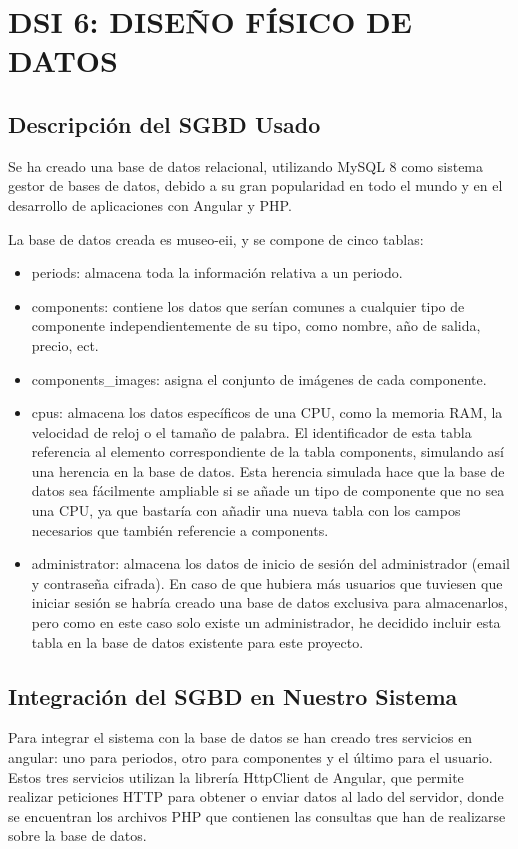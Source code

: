 \newpage
\section{DSI 6: DISEÑO FÍSICO DE DATOS}

\subsection{Descripción del SGBD Usado} 
Se ha creado una base de datos relacional, utilizando MySQL 8 como sistema gestor de bases de datos, debido a su gran popularidad en todo el mundo y en el desarrollo de aplicaciones con Angular y PHP.
\par La base de datos creada es museo-eii, y se compone de cinco tablas: 
\begin{itemize}
	\item periods: almacena toda la información relativa a un periodo.
	\item components: contiene los datos que serían comunes a cualquier tipo de componente independientemente de su tipo, como nombre, año de salida, precio, ect.
	\item components\_images: asigna el conjunto de imágenes de cada componente.
	\item cpus: almacena los datos específicos de una CPU, como la memoria RAM, la velocidad de reloj o el tamaño de palabra. El identificador de esta tabla referencia al elemento correspondiente de la tabla components, simulando así una herencia en la base de datos. Esta herencia simulada hace que la base de datos sea fácilmente ampliable si se añade un tipo de componente que no sea una CPU, ya que bastaría con añadir una nueva tabla con los campos necesarios que también referencie a components.
	\item administrator: almacena los datos de inicio de sesión del administrador (email y contraseña cifrada). En caso de que hubiera más usuarios que tuviesen que iniciar sesión se habría creado una base de datos exclusiva para almacenarlos, pero como en este caso solo existe un administrador, he decidido incluir esta tabla en la base de datos existente para este proyecto.
\end{itemize}
\subsection{Integración del SGBD en Nuestro Sistema} 
Para integrar el sistema con la base de datos se han creado tres servicios en angular: uno para periodos, otro para componentes y el último para el usuario. Estos tres servicios utilizan la librería HttpClient de Angular, que permite realizar peticiones HTTP para obtener o enviar datos al lado del servidor, donde se encuentran los archivos PHP que contienen las consultas que han de realizarse sobre la base de datos.
